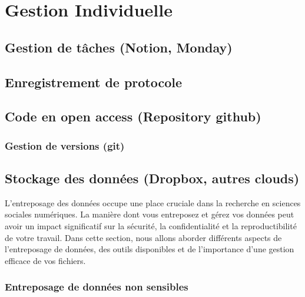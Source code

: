 \documentclass[
  letterpaper,
]{scrbook}
\begin{document}
\hypertarget{gestion-individuelle}{%
\section{Gestion Individuelle}\label{gestion-individuelle}}

\hypertarget{gestion-de-tuxe2ches-notion-monday}{%
\subsection{Gestion de tâches (Notion,
Monday)}\label{gestion-de-tuxe2ches-notion-monday}}

\hypertarget{enregistrement-de-protocole}{%
\subsection{Enregistrement de
protocole}\label{enregistrement-de-protocole}}

\hypertarget{code-en-open-access-repository-github}{%
\subsection{Code en open access (Repository
github)}\label{code-en-open-access-repository-github}}

\hypertarget{gestion-de-versions-git}{%
\subsubsection{Gestion de versions
(git)}\label{gestion-de-versions-git}}

\hypertarget{stockage-des-donnuxe9es-dropbox-autres-clouds}{%
\subsection{Stockage des données (Dropbox, autres
clouds)}\label{stockage-des-donnuxe9es-dropbox-autres-clouds}}

L'entreposage des données occupe une place cruciale dans la recherche en
sciences sociales numériques. La manière dont vous entreposez et gérez
vos données peut avoir un impact significatif sur la sécurité, la
confidentialité et la reproductibilité de votre travail. Dans cette
section, nous allons aborder différents aspects de l'entreposage de
données, des outils disponibles et de l'importance d'une gestion
efficace de vos fichiers.

\hypertarget{entreposage-de-donnuxe9es-non-sensibles}{%
\subsubsection{Entreposage de données non
sensibles}\label{entreposage-de-donnuxe9es-non-sensibles}}
\end{document}
